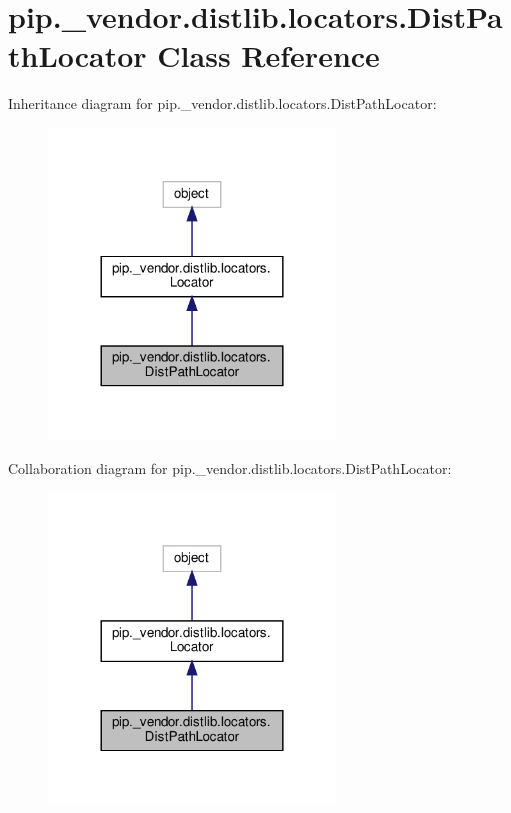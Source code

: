 \hypertarget{classpip_1_1__vendor_1_1distlib_1_1locators_1_1DistPathLocator}{}\section{pip.\+\_\+vendor.\+distlib.\+locators.\+Dist\+Path\+Locator Class Reference}
\label{classpip_1_1__vendor_1_1distlib_1_1locators_1_1DistPathLocator}


Inheritance diagram for pip.\+\_\+vendor.\+distlib.\+locators.\+Dist\+Path\+Locator\+:
\nopagebreak
\begin{figure}[H]
\begin{center}
\leavevmode
\includegraphics[width=216pt]{classpip_1_1__vendor_1_1distlib_1_1locators_1_1DistPathLocator__inherit__graph}
\end{center}
\end{figure}


Collaboration diagram for pip.\+\_\+vendor.\+distlib.\+locators.\+Dist\+Path\+Locator\+:
\nopagebreak
\begin{figure}[H]
\begin{center}
\leavevmode
\includegraphics[width=216pt]{classpip_1_1__vendor_1_1distlib_1_1locators_1_1DistPathLocator__coll__graph}
\end{center}
\end{figure}
